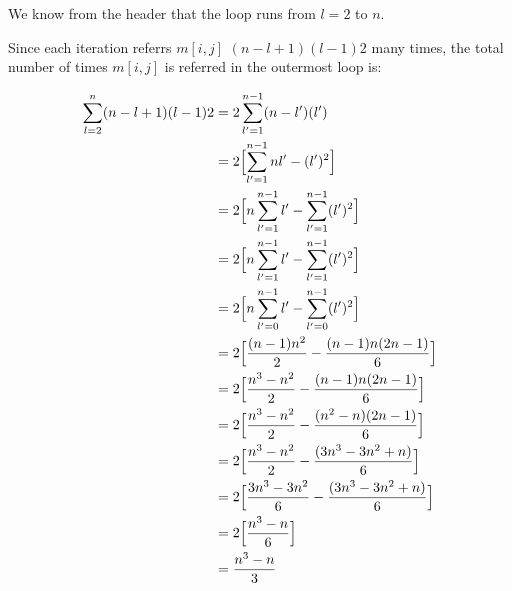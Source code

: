 \documentclass[12pt]{article}
\begin{document}
\begin{enumerate}[1.]
    \bigskip

    We know from the header that the loop runs from $l = 2$ to $n$.

    \bigskip

    Since each iteration referrs $m[i,j]$ $(n - l + 1)(l - 1)2$ many times, the total number
    of times $m[i,j]$ is referred in the outermost loop is:

    \bigskip

    \begin{align}
        \sum\limits_{l=2}^{n} (n - l + 1)(l - 1)2 &= 2\sum\limits_{l'=1}^{n-1} (n - l')(l')\\
        &= 2 \Bigl[\sum\limits_{l'=1}^{n-1} nl' - (l')^2 \Bigr]\\
        &= 2 \Bigl[ n \sum\limits_{l'=1}^{n-1} l' - \sum\limits_{l'=1}^{n-1} (l')^2 \Bigr]\\
        &= 2 \Bigl[ n \sum\limits_{l'=1}^{n-1} l' - \sum\limits_{l'=1}^{n-1} (l')^2 \Bigr]\\
        &= 2 \Bigl[ n \sum\limits_{l'=0}^{n-1} l' - \sum\limits_{l'=0}^{n-1} (l')^2 \Bigr]\\
        &= 2 \Bigl[ \frac{(n-1)n^2}{2} - \frac{(n-1)n(2n-1)}{6} \Bigr]\\
        &= 2 \Bigl[ \frac{n^3 - n^2}{2} - \frac{(n-1)n(2n-1)}{6} \Bigr]\\
        &= 2 \Bigl[ \frac{n^3 - n^2}{2} - \frac{(n^2-n)(2n-1)}{6} \Bigr]\\
        &= 2 \Bigl[ \frac{n^3 - n^2}{2} - \frac{(3n^3-3n^2 + n)}{6} \Bigr]\\
        &= 2 \Bigl[ \frac{3n^3 - 3n^2}{6} - \frac{(3n^3-3n^2 + n)}{6} \Bigr]\\
        &= 2 \Bigl[ \frac{n^3 - n}{6}\Bigr]\\
        &= \frac{n^3 - n}{3}
    \end{align}








\end{enumerate}
\end{document}
